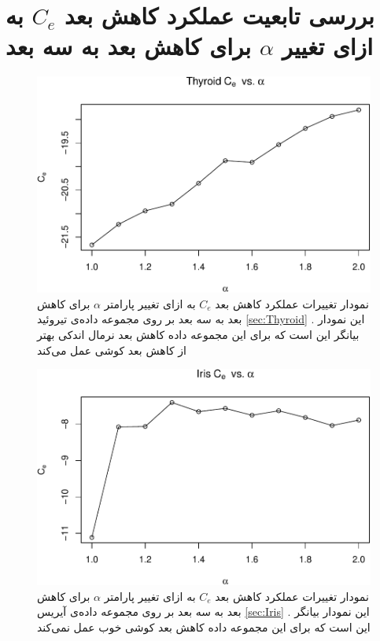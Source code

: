 \section{
بررسی تابعیت عملکرد کاهش بعد $C_e$ به ازای تغییر $\alpha$ برای کاهش بعد به سه بعد
}


\begin{figure}[H]
\centering
\includegraphics[width=0.7\linewidth]{Report_files/figure-latex/unnamed-chunk-22-1}
\caption{
نمودار تغییرات عملکرد کاهش بعد 
$C_e$
به ازای تغییر پارامتر
$\alpha$
برای کاهش بعد به 
سه بعد بر روی مجموعه داده‌‌‌ی 
تیروئید
\ref{sec:Thyroid}
. این نمودار بیانگر این است که برای این مجموعه داده کاهش بعد 
نرمال
اندکی بهتر از کاهش بعد 
کوشی 
عمل می‌کند
}
\end{figure}

\begin{figure}[H]
\centering
\includegraphics[width=0.7\linewidth]{Report_files/figure-latex/unnamed-chunk-22-2}
\caption{
نمودار تغییرات عملکرد کاهش بعد 
$C_e$
به ازای تغییر پارامتر
$\alpha$
برای کاهش بعد به 
سه بعد بر روی مجموعه داده‌‌‌ی 
آیریس
\ref{sec:Iris}
. این نمودار بیانگر این است که برای این مجموعه داده کاهش بعد 
کوشی 
خوب عمل نمی‌کند
}
\end{figure}

